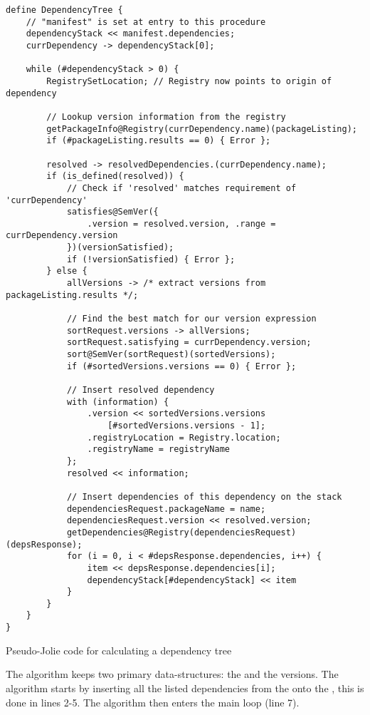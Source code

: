 \begin{coded}
\begin{verbatim}
define DependencyTree {
    // "manifest" is set at entry to this procedure
    dependencyStack << manifest.dependencies;
    currDependency -> dependencyStack[0];

    while (#dependencyStack > 0) {
        RegistrySetLocation; // Registry now points to origin of dependency

        // Lookup version information from the registry
        getPackageInfo@Registry(currDependency.name)(packageListing);
        if (#packageListing.results == 0) { Error };

        resolved -> resolvedDependencies.(currDependency.name);
        if (is_defined(resolved)) {
            // Check if 'resolved' matches requirement of 'currDependency'
            satisfies@SemVer({
                .version = resolved.version, .range = currDependency.version
            })(versionSatisfied);
            if (!versionSatisfied) { Error };
        } else {
            allVersions -> /* extract versions from packageListing.results */;

            // Find the best match for our version expression
            sortRequest.versions -> allVersions;
            sortRequest.satisfying = currDependency.version;
            sort@SemVer(sortRequest)(sortedVersions);
            if (#sortedVersions.versions == 0) { Error };

            // Insert resolved dependency
            with (information) {
                .version << sortedVersions.versions
                    [#sortedVersions.versions - 1];
                .registryLocation = Registry.location;
                .registryName = registryName
            };
            resolved << information;

            // Insert dependencies of this dependency on the stack
            dependenciesRequest.packageName = name;
            dependenciesRequest.version << resolved.version;
            getDependencies@Registry(dependenciesRequest)(depsResponse);
            for (i = 0, i < #depsResponse.dependencies, i++) {
                item << depsResponse.dependencies[i];
                dependencyStack[#dependencyStack] << item
            }
        }
    }
}
\end{verbatim}
\caption{Pseudo-Jolie code for calculating a dependency tree}
\label{lst:dep_tree}
\end{coded}

The algorithm keeps two primary data-structures: the 
and the  versions. The algorithm starts by inserting all the
listed dependencies from the  onto the
, this is done in lines 2-5. The algorithm then enters
the main loop (line 7).

